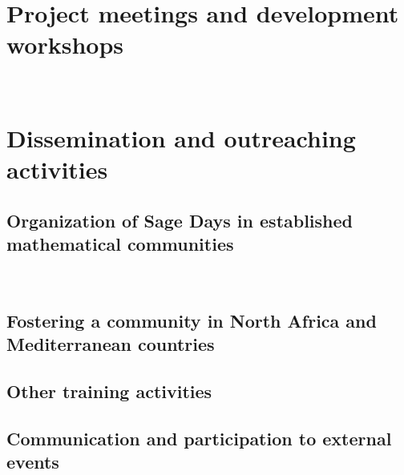 \documentclass{../../Proposal/LaTeX-proposal/deliverablereport}
\author{Viviane Pons}
\begin{document}
\maketitle
\githubissuedescription


\section{Project meetings and development workshops}
~









%







\section{Dissemination and outreaching activities}

\subsection{Organization of Sage Days in established mathematical communities}
~





\subsection{Fostering a community in North Africa and Mediterranean countries}

\subsection{Other training activities}

\subsection{Communication and participation to external events}
\end{document}
